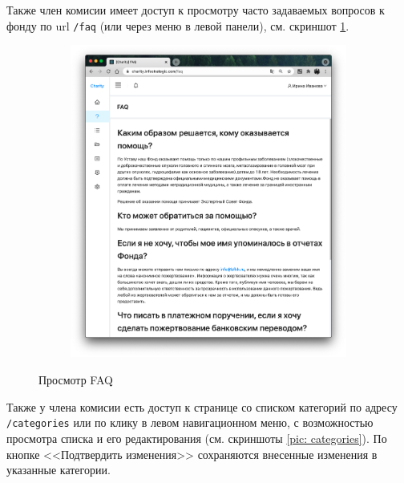 \documentclass[a4paper,12pt,reqno]{article}
\begin{document}
	Также член комисии имеет доступ к просмотру часто задаваемых вопросов к фонду по url \texttt{/faq} (или через меню в левой панели), см. скриншот \ref{pic: faq_super}. 
	
	\begin{figure}[H]
	    \centering
		\begin{subfigure}[b]{0.475\linewidth}
			\includegraphics[width=\linewidth]{img/ro/faq_super.png}
		\end{subfigure}
		\caption{Просмотр FAQ}
		\label{pic: faq_super}
	\end{figure}
	
	Также у члена комисии есть доступ к странице со списком категорий по адресу \texttt{/categories} или по клику в левом навигационном меню, с возможностью просмотра списка и его редактирования (см. скриншоты \ref{pic: categories}). По кнопке <<Подтвердить изменения>> сохраняются внесенные изменения в указанные категории. 
	
\end{document}
